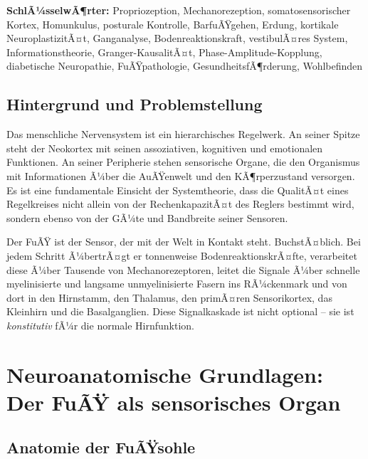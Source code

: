 ﻿\documentclass[12pt,a4paper]{report}
\theoremstyle{plain}
\theoremstyle{definition}
\theoremstyle{remark}
\begin{document}
\textbf{SchlÃ¼sselwÃ¶rter:}
Propriozeption, Mechanorezeption, somatosensorischer Kortex, Homunkulus,
posturale Kontrolle, BarfuÃŸgehen, Erdung, kortikale NeuroplastizitÃ¤t,
Ganganalyse, Bodenreaktionskraft, vestibulÃ¤res System, Informationstheorie,
Granger-KausalitÃ¤t, Phase-Amplitude-Kopplung, diabetische Neuropathie,
FuÃŸpathologie, GesundheitsfÃ¶rderung, Wohlbefinden

\section{Hintergrund und Problemstellung}

Das menschliche Nervensystem ist ein hierarchisches Regelwerk. An seiner
Spitze steht der Neokortex mit seinen assoziativen, kognitiven und emotionalen
Funktionen. An seiner Peripherie stehen sensorische Organe, die den Organismus
mit Informationen Ã¼ber die AuÃŸenwelt und den KÃ¶rperzustand versorgen. Es ist
eine fundamentale Einsicht der Systemtheorie, dass die QualitÃ¤t eines
Regelkreises nicht allein von der RechenkapazitÃ¤t des Reglers bestimmt wird,
sondern ebenso von der GÃ¼te und Bandbreite seiner Sensoren.

Der FuÃŸ ist der Sensor, der mit der Welt in Kontakt steht. BuchstÃ¤blich.
Bei jedem Schritt Ã¼bertrÃ¤gt er tonnenweise BodenreaktionskrÃ¤fte, verarbeitet
diese Ã¼ber Tausende von Mechanorezeptoren, leitet die Signale Ã¼ber schnelle
myelinisierte und langsame unmyelinisierte Fasern ins RÃ¼ckenmark und von dort
in den Hirnstamm, den Thalamus, den primÃ¤ren Sensorikortex, das Kleinhirn
und die Basalganglien. Diese Signalkaskade ist nicht optional -- sie ist
\emph{konstitutiv} fÃ¼r die normale Hirnfunktion.

\chapter{Neuroanatomische Grundlagen: Der FuÃŸ als sensorisches Organ}

\section{Anatomie der FuÃŸsohle}
\end{document}
